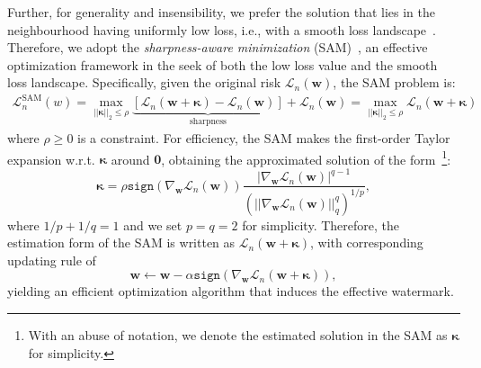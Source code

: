 \documentclass{article}
\begin{document}
Further, for generality and insensibility, we prefer the solution that lies in the neighbourhood having uniformly low loss, i.e., with a smooth loss landscape~\cite{KeskarMNST17}. Therefore, we adopt the \emph{sharpness-aware minimization} (SAM)~\cite{ForetKMN21}, an effective optimization framework in the seek of both the low loss value and the smooth loss landscape. Specifically, given the original risk $\mathcal{L}_n(\boldsymbol{w})$, the SAM problem is:
\begin{align}
    \mathcal{L}^\text{SAM}_n(w)=\max_{\lvert\lvert \boldsymbol{\kappa}\rvert\rvert_2\le\rho} \underbrace{\left[\mathcal{L}_n(\boldsymbol{w} + \boldsymbol{\kappa}) - \mathcal{L}_n(\boldsymbol{w})\right]}_\text{sharpness} + \mathcal{L}_n(\boldsymbol{w})=\max_{\lvert\lvert \boldsymbol{\kappa}\rvert\rvert_2\le\rho} \mathcal{L}_n(\boldsymbol{w} + \boldsymbol{\kappa})
\end{align}
where $\rho\ge 0$ is a constraint. For efficiency, the SAM makes the first-order Taylor expansion w.r.t. $\boldsymbol{\kappa}$ around $\boldsymbol{0}$, obtaining the approximated solution of the form~\footnote{With an abuse of notation, we denote the estimated solution in the SAM as $\boldsymbol{\kappa}$ for simplicity.}:
\begin{equation}
    \boldsymbol{\kappa} = \rho \texttt{sign} (\nabla_{\boldsymbol{w}} \mathcal{L}_n(\boldsymbol{w}))\frac{\lvert\nabla_{\boldsymbol{w}} \mathcal{L}_n(\boldsymbol{w})\rvert^{q-1}}{\left(\lvert\lvert\nabla_{\boldsymbol{w}} \mathcal{L}_n(\boldsymbol{w})\rvert\vert_q^q\right)^{1/p}},
\end{equation}
where $1/p+1/q=1$ and we set $p=q=2$ for simplicity. Therefore, the estimation form of the SAM is written as $\mathcal{L}_n(\boldsymbol{w} + \boldsymbol{\kappa})$, with corresponding updating rule of
\begin{equation}
    \boldsymbol{w}\leftarrow \boldsymbol{w}-\alpha \texttt{sign}(\nabla_{\boldsymbol{w}} \mathcal{L}_n(\boldsymbol{w}+\boldsymbol{\kappa})), \label{eq: sign_sam}
\end{equation}
yielding an efficient optimization algorithm that induces the effective watermark. 
\end{document}
